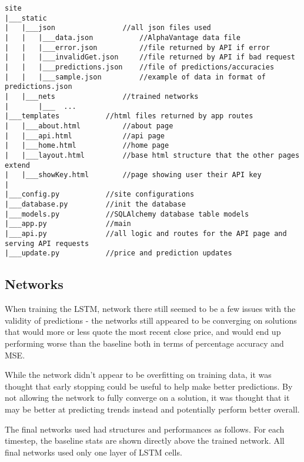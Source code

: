         \begin{verbatim}
site
|___static 
|   |___json                //all json files used
|   |   |___data.json           //AlphaVantage data file
|   |   |___error.json          //file returned by API if error
|   |   |___invalidGet.json     //file returned by API if bad request
|   |   |___predictions.json    //file of predictions/accuracies
|   |   |___sample.json         //example of data in format of predictions.json
|   |___nets                //trained networks
|       |___  ...
|___templates           //html files returned by app routes
|   |___about.html          //about page
|   |___api.html            //api page
|   |___home.html           //home page
|   |___layout.html         //base html structure that the other pages extend
|   |___showKey.html        //page showing user their API key
|
|___config.py           //site configurations 
|___database.py         //init the database
|___models.py           //SQLAlchemy database table models
|___app.py              //main 
|___api.py              //all logic and routes for the API page and serving API requests
|___update.py           //price and prediction updates
        \end{verbatim}

        \subsection{Networks}
        
        When training the LSTM, network there still seemed to be a few issues with the validity of predictions - the networks still appeared to be converging on solutions that would more or less quote the most recent close price, and would end up performing worse than the baseline both in terms of percentage accuracy and MSE. 

        While the network didn't appear to be overfitting on training data, it was thought that early stopping could be useful to help make better predictions. By not allowing the network to fully converge on a solution, it was thought that it may be better at predicting trends instead and potentially perform better overall.

        The final networks used had structures and performances as follows. For each timestep, the baseline stats are shown directly above the trained network. All final networks used only one layer of LSTM cells.

